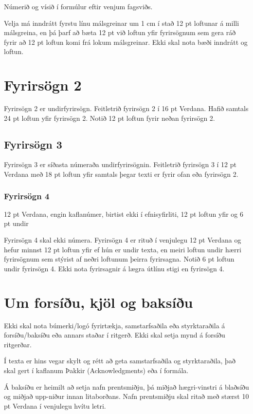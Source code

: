 \documentclass[a4paper, 12pt, twoside]{scrreprt}
\begin{document}
Númerið og vísið í formúlur eftir venjum fagsviðs.

Velja má inndrátt fyrstu línu málsgreinar um 1 cm í stað 12 pt loftunar á milli málsgreina, en þá þarf að bæta 12 pt við loftun yfir fyrirsögnum sem gera ráð fyrir að 12 pt loftun komi frá lokum málsgreinar. Ekki skal nota bæði inndrátt og loftun.

\section{Fyrirsögn 2}
Fyrirsögn 2 er undirfyrirsögn. Feitletrið fyrirsögn 2 í 16 pt Verdana. Hafið samtals 24 pt loftun yfir fyrirsögn 2. Notið 12 pt loftun fyrir neðan fyrirsögn 2.

\subsection{Fyrirsögn 3}
Fyrirsögn 3 er síðasta númeraða undirfyrirsögnin. Feitletrið fyrirsögn 3 í 12 pt Verdana með 18 pt loftun yfir samtals þegar texti er fyrir ofan eða fyrirsögn 2. 
\subsubsection{Fyrirsögn 4}
12 pt Verdana, engin kaflanúmer, birtist ekki í efnisyfirliti, 12 pt loftun yfir og 6 pt undir

Fyrirsögn 4 skal ekki númera. Fyrirsögn 4 er rituð í venjulegu 12 pt Verdana og hefur minnst 12 pt loftun yfir ef hún er undir texta, en meiri loftun undir hærri fyrirsögnum sem stýrist af neðri loftunum þeirra fyrirsagna. Notið 6 pt loftun undir fyrirsögn 4.
Ekki nota fyrirsagnir á lægra útlínu stigi en fyrirsögn 4.

\section{Um forsíðu, kjöl og baksíðu}
Ekki skal nota búmerki/logó fyrirtækja, samstarfsaðila eða styrktaraðila á forsíðu/baksíðu eða annars staðar í ritgerð. Ekki skal setja mynd á forsíðu ritgerðar. 

Í texta er hins vegar skylt og rétt að geta samstarfsaðila og styrktaraðila, það skal gert í kaflanum Þakkir (Acknowledgments) eða í formála.

Á baksíðu er heimilt að setja nafn prentsmiðju, þá miðjað hægri-vinstri á blaðsíðu og miðjað upp-niður innan litaborðans. Nafn prentsmiðju skal ritað með stærst 10 pt Verdana í venjulegu hvítu letri.
\end{document}
